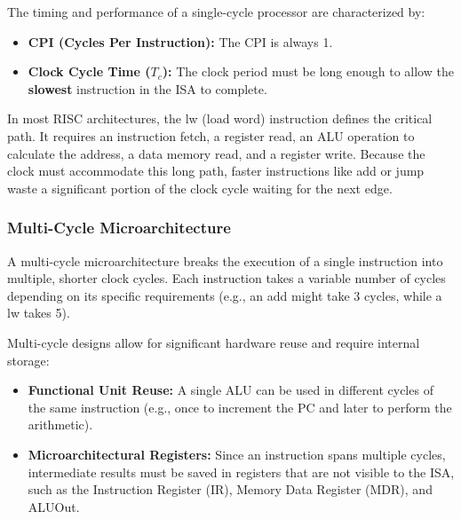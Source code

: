 \begin{important}
	The timing and performance of a single-cycle processor are characterized by:
	\begin{itemize}
		\item \textbf{CPI (Cycles Per Instruction):} The CPI is always 1.
		\item \textbf{Clock Cycle Time ($T_c$):} The clock period must be long enough to allow the \textbf{slowest} instruction in the ISA to complete.
	\end{itemize}
\end{important}

\begin{remark}
	In most RISC architectures, the lw (load word) instruction defines the critical path. It requires an instruction fetch, a register read, an ALU operation to calculate the address, a data memory read, and a register write. Because the clock must accommodate this long path, faster instructions like add or jump waste a significant portion of the clock cycle waiting for the next edge.
\end{remark}

\subsubsection{Multi-Cycle Microarchitecture}

\begin{definition}
	A multi-cycle microarchitecture breaks the execution of a single instruction into multiple, shorter clock cycles. Each instruction takes a variable number of cycles depending on its specific requirements (e.g., an add might take 3 cycles, while a lw takes 5).
\end{definition}

\begin{important}
	Multi-cycle designs allow for significant hardware reuse and require internal storage:
	\begin{itemize}
		\item \textbf{Functional Unit Reuse:} A single ALU can be used in different cycles of the same instruction (e.g., once to increment the PC and later to perform the arithmetic).
		\item \textbf{Microarchitectural Registers:} Since an instruction spans multiple cycles, intermediate results must be saved in registers that are not visible to the ISA, such as the Instruction Register (IR), Memory Data Register (MDR), and ALUOut.
	\end{itemize}
\end{important}

